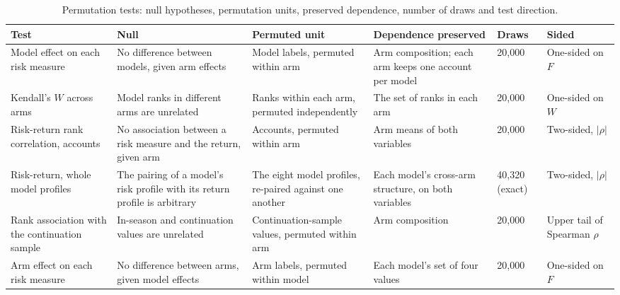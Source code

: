 \begin{table}[ht]
\centering
\scriptsize
\caption{Permutation tests: null hypotheses, permutation units,
preserved dependence, number of draws and test direction.}
\label{tab:registry}
\begin{tabular}{p{2.6cm}p{2.8cm}p{2.5cm}p{2.7cm}p{1.3cm}p{1.9cm}}
\toprule
Test & Null & Permuted unit & Dependence preserved & Draws & Sided \\
\midrule
Model effect on each risk measure & No difference between models, given arm effects & Model labels, permuted within arm & Arm composition; each arm keeps one account per model & 20,000 & One-sided on $F$ \\
Kendall's $W$ across arms & Model ranks in different arms are unrelated & Ranks within each arm, permuted independently & The set of ranks in each arm & 20,000 & One-sided on $W$ \\
Risk-return rank correlation, accounts & No association between a risk measure and the return, given arm & Accounts, permuted within arm & Arm means of both variables & 20,000 & Two-sided, $|\rho|$ \\
Risk-return, whole model profiles & The pairing of a model's risk profile with its return profile is arbitrary & The eight model profiles, re-paired against one another & Each model's cross-arm structure, on both variables & 40,320 (exact) & Two-sided, $|\rho|$ \\
Rank association with the continuation sample & In-season and continuation values are unrelated & Continuation-sample values, permuted within arm & Arm composition & 20,000 & Upper tail of Spearman $\rho$ \\
Arm effect on each risk measure & No difference between arms, given model effects & Arm labels, permuted within model & Each model's set of four values & 20,000 & One-sided on $F$ \\
\bottomrule
\end{tabular}
\end{table}
